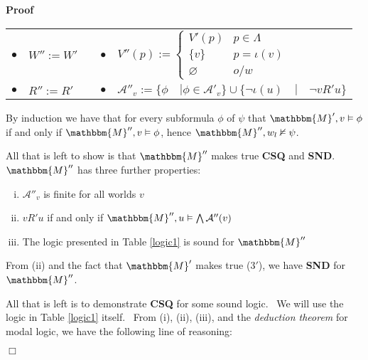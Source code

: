 \documentclass{acmconf}
\newcommand{\assign}{:=}
\newcommand{\tmtextbf}[1]{{\bfseries{#1}}}
\newcommand{\tmtextit}[1]{{\itshape{#1}}}
\newenvironment{enumerateroman}{\begin{enumerate}[i.] }{\end{enumerate}}
\newenvironment{proof}{\noindent\textbf{Proof\ }}{\hspace*{\fill}$\Box$\medskip}
\begin{document}
\begin{proof}
  
  
  \begin{center}
    \begin{tabular}{lllll}
      $\bullet$ & $W'' \assign W'$ &  & $\bullet$ & $V'' (p) \assign \left\{
      \begin{array}{ll}
        V' (p) & p \in \Lambda\\
        \{v\} & p = \iota (v)\\
        \varnothing & o / w
      \end{array} \right.$\\
      $\bullet$ & $R'' \assign R'$ & {\hspace{3em}} & $\bullet$ &
      $\mathcal{A}''_v \assign \{\phi \hspace{1em} | \phi \in \mathcal{A}'_v
      \} \cup \{\neg \iota (u) \hspace{1em} | \hspace{1em} \neg v R' u\}$
    \end{tabular}
  \end{center}
  
  
  
  By induction we have that for every subformula $\phi$ of $\psi$ that
  $\mathbbm{M}', v \vDash \phi$ if and only if $\mathbbm{M}'', v \vDash \phi$,
  hence $\mathbbm{M}'', w_l \nvDash \psi$.
  
  
  
  All that is left to show is that $\mathbbm{M}''$ makes true \tmtextbf{CSQ}
  and \tmtextbf{SND}. \ $\mathbbm{M}''$ has three further properties:
  \begin{enumerateroman}
    \item $\mathcal{A}''_v$ is finite for all worlds $v$
    
    \item  $v R' u$ if and only if $\mathbbm{M}'', u \vDash \bigwedge
    \mathcal{A}'' (v)$
    
    \item The logic presented in Table \ref{logic1} is sound for
    $\mathbbm{M}''$
  \end{enumerateroman}
  From (ii) and the fact that $\mathbbm{M}'$ makes true (3$'$), we have
  \tmtextbf{SND} for $\mathbbm{M}''$.
  
  
  
  All that is left is to demonstrate \tmtextbf{CSQ} for some sound logic. \ We
  will use the logic in Table \ref{logic1} itself. \ From (i), (ii), (iii),
  and the \tmtextit{deduction theorem} for modal logic, we have the following
  line of reasoning:
  

\end{proof}
\end{document}
